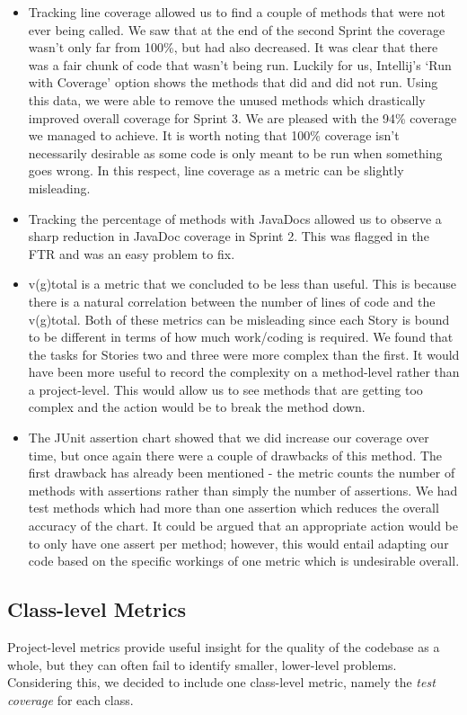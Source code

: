 \documentclass[12pt]{article}
\begin{document}
\begin{itemize}
    \item Tracking line coverage allowed us to find a couple of methods that were not ever being called. We saw that at the end of the second Sprint the coverage wasn't only far from 100\%, but had also decreased. It was clear that there was a fair chunk of code that wasn't being run. Luckily for us, Intellij's `Run with Coverage' option shows the methods that did and did not run. Using this data, we were able to remove the unused methods which drastically improved overall coverage for Sprint 3. We are pleased with the 94\% coverage we managed to achieve. It is worth noting that 100\% coverage isn't necessarily desirable as some code is only meant to be run when something goes wrong. In this respect, line coverage as a metric can be slightly misleading.
    \item Tracking the percentage of methods with JavaDocs allowed us to observe a sharp reduction in JavaDoc coverage in Sprint 2. This was flagged in the FTR and was an easy problem to fix. 
    \item v(g)total is a metric that we concluded to be less than useful. This is because there is a natural correlation between the number of lines of code and the v(g)total. Both of these metrics can be misleading since each Story is bound to be different in terms of how much work/coding is required. We found that the tasks for Stories two and three were more complex than the first. It would have been more useful to record the complexity on a method-level rather than a project-level. This would allow us to see methods that are getting too complex and the action would be to break the method down. 
    \item The JUnit assertion chart showed that we did increase our coverage over time, but once again there were a couple of drawbacks of this method. The first drawback has already been mentioned - the metric counts the number of methods with assertions rather than simply the number of assertions. We had test methods which had more than one assertion which reduces the overall accuracy of the chart. It could be argued that an appropriate action would be to only have one assert per method; however, this would entail adapting our code based on the specific workings of one metric which is undesirable overall.
\end{itemize}

\subsection{Class-level Metrics}
Project-level metrics provide useful insight for the quality of the codebase as a whole, but they can often fail to identify smaller, lower-level problems. Considering this, we decided to include one class-level metric, namely the \emph{test coverage} for each class. 
\end{document}
